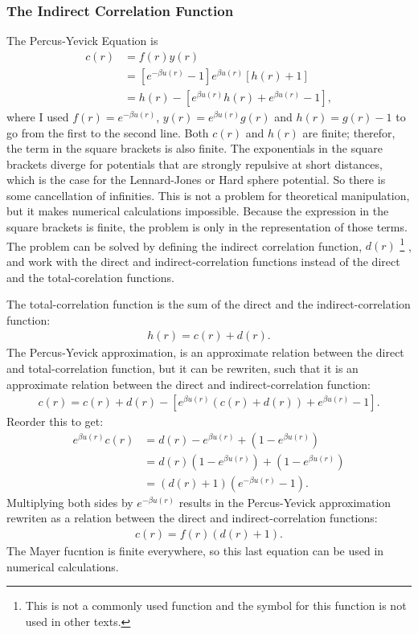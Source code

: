 \subsubsection{The Indirect Correlation Function}
The Percus-Yevick Equation is 
\begin{align}
c(r) &= f(r)y(r)\\
&= \left[ e^{-\beta u(r)} - 1\right]
    e^{\beta u(r)} \left[ h(r) + 1\right] \\
&= h(r) - \left[ e^{\beta u(r)} h(r) +
    e^{\beta u(r)} - 1 \right],
\label{eq:py_problem}
\end{align}
where I used $f(r) = e^{-\beta u(r)}$, $y(r) = e^{\beta u(r)} g(r)$ and $h(r) = g(r) - 1$ to go from the first to the second line.
Both $c(r)$ and $h(r)$ are finite; therefor, the term in the 
square brackets is also finite.
The exponentials in the square brackets diverge for potentials that are strongly repulsive at short distances, which is the case for the Lennard-Jones or Hard sphere potential.
So there is some cancellation of infinities.
This is not a problem for theoretical manipulation,
but it makes numerical calculations impossible.
Because the expression in the square brackets is finite, the problem is only in the representation of those terms.
The problem can be solved by defining the indirect correlation function, $d(r)$
\footnote{This is not a commonly used function and the symbol for this function is not used in other texts.}
, and work with the direct and indirect-correlation functions instead of the direct and the total-corelation functions. 

The total-correlation function is the sum of the direct and the indirect-correlation function:
\begin{align}
h(r) = c(r) + d(r).
\end{align}
The Percus-Yevick approximation, is an approximate relation between the direct and total-correlation function, but it can be rewriten, such that it is an approximate relation between the direct and indirect-correlation function:
\begin{align}
c(r) = c(r) + d(r) - 
    \left[
    e^{\beta u(r)} \left( c(r) + d(r) \right) 
    + e^{\beta u(r)} - 1
    \right].
\end{align}
Reorder this to get:
\begin{align}
e^{\beta u(r)} c(r) &= d(r) - e^{\beta u(r)} +
        \left( 1- e^{\beta u(r)} \right) \\
&= d(r) \left( 1-e^{\beta u(r)} \right)
        + \left( 1-e^{\beta u(r)} \right) \\
&= \left( d(r) + 1 \right) \left( e^{-\beta u(r)} - 1 \right).
\end{align}
Multiplying both sides by $e^{-\beta u(r)}$ results in the 
Percus-Yevick approximation rewriten as a relation between
the direct and indirect-correlation functions:
\begin{align}
c(r)= f(r)\left( d(r) + 1 \right).
\label{eq:py_c_d}
\end{align}
The Mayer fucntion is finite everywhere, so this last equation can be used in numerical calculations.


